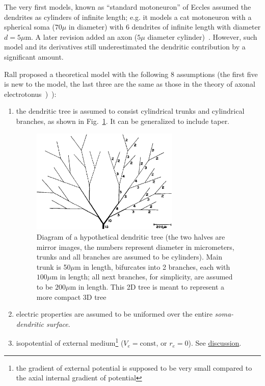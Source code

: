 The very first models, known as ``standard motoneuron'' of Eccles
\cite{eccles1957pnc} assumed the dendrites as cylinders of infinite
length; e.g. it models a cat motoneuron with a spherical soma ($70\mu$
in diameter) with 6 dendrites of infinite length with diameter
$d=5\mu$m. A later revision added an axon ($5\mu$ diameter
cylinder)~\cite{coombs1959ecm}. However, such model and its
derivatives still underestimated the dendritic contribution by a
significant amount.

Rall proposed a theoretical model with the following 8 assumptions
(the first five is new to the model, the last three are the same as
those in the theory of axonal
electrotonus~\cite{hodgkin1946ecc})~\cite{rall1959bdt}):
\begin{enumerate}
\item the dendritic tree is assumed to consist cylindrical trunks and
  cylindrical branches, as shown in
  Fig.~\ref{fig:dendritic_tree}. It can be generalized to include
  taper.

\begin{figure}[hbt]
 \centerline{\includegraphics[height=5cm, angle=0]{./images/dendritic_tree.eps}}
 \caption{Diagram of a hypothetical dendritic tree (the two halves are
   mirror images, the numbers represent diameter in micrometers,
   trunks and all branches are assumed to be cylinders). Main trunk is
   50$\mu$m in length, bifurcates into 2 branches, each with
   $100\mu$m in length; all next branches, for simplicity, are assumed
   to be $200\mu$m in length. This 2D tree is meant to represent a more
   compact 3D tree}
\label{fig:dendritic_tree}
\end{figure}

\item electric properties are assumed to be uniformed over the entire
  {\it soma-dendritic surface}.

\item isopotential of external
  medium\footnote{the gradient of external potential is supposed to be
    very small compared to the axial internal gradient of potential}
  ($V_e=\text{const}$, or $r_e=0$). See
  \hyperref[sec:disc-homog-vs]{discussion}.


\end{enumerate}
